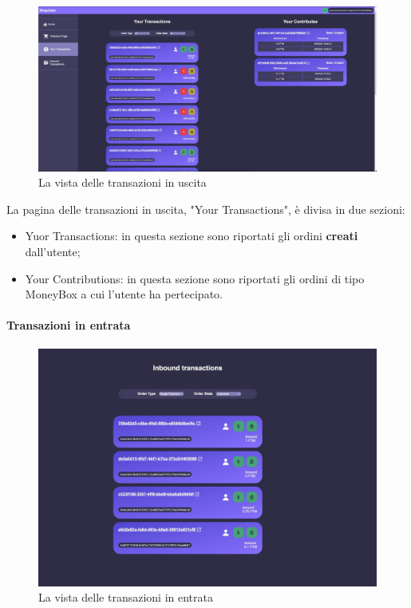             \begin{figure}[H]
                \centering
                \includegraphics[scale=0.4]{immagini/transactionview.jpg}
                \caption{La vista delle transazioni in uscita}
            \end{figure}

            La pagina delle transazioni in uscita, "Your Transactions", è divisa in due sezioni:
            \begin{itemize}
                \item Yuor Transactions: in questa sezione sono riportati gli ordini \textbf{creati} dall'utente;
                \item Your Contributions: in questa sezione sono riportati gli ordini di tipo MoneyBox a cui l'utente ha pertecipato.
            \end{itemize}

            \paragraph{Transazioni in entrata}

            \begin{figure}[H]
                \centering
                \includegraphics[scale=0.4]{immagini/inboundtransactions.jpg}
                \caption{La vista delle transazioni in entrata}
            \end{figure}

